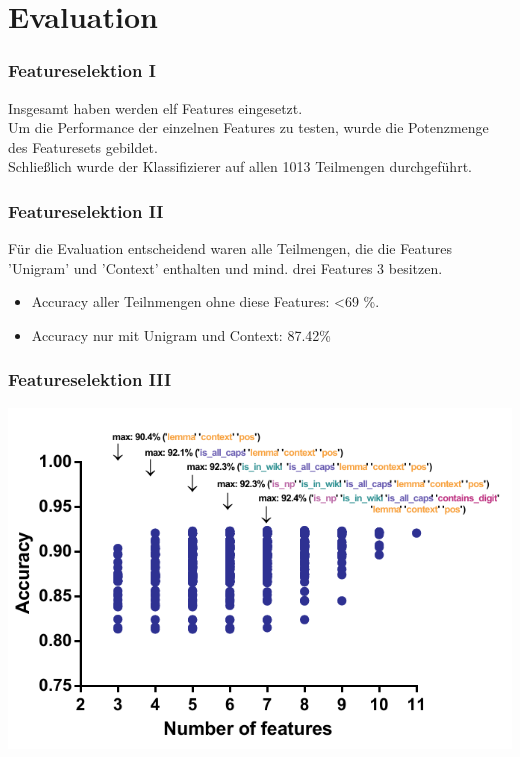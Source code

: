 \documentclass{beamer}
\begin{document}
\section{Evaluation}
	\begin{frame}
		\frametitle{Featureselektion I}
		Insgesamt haben werden elf Features eingesetzt.\\
		
		Um die Performance der einzelnen Features zu testen, wurde die Potenzmenge des Featuresets gebildet.\\
		
		Schließlich wurde der Klassifizierer auf allen 1013 Teilmengen durchgeführt.\\
	\end{frame}
	\begin{frame}
		\frametitle{Featureselektion II}
			Für die Evaluation entscheidend waren alle Teilmengen, die die Features 'Unigram' und 'Context' enthalten und mind. drei Features 3 besitzen.\\
					
			\begin{itemize}
				\item Accuracy aller Teilnmengen ohne diese Features: \textless 69 \%.
				\item Accuracy nur mit Unigram und Context: 87.42\%
			\end{itemize}

					
	\end{frame}
		\begin{frame}
			\frametitle{Featureselektion III}
			\includegraphics[scale=0.9]{accuracy.pdf}\\

		\end{frame}
\end{document}

